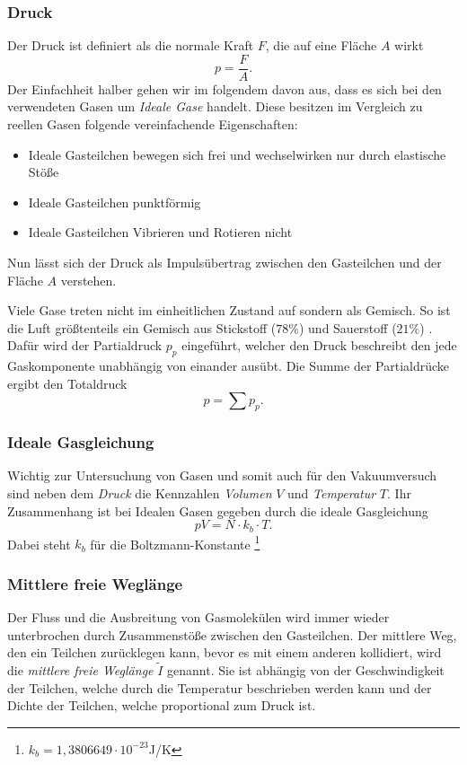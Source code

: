 \subsubsection{Druck}
Der Druck ist definiert als die normale Kraft $F$, die auf eine Fläche $A$ wirkt
\begin{equation}
    p = \frac{F}{A}. \label{eq:Druck}
\end{equation}
Der Einfachheit halber gehen wir im folgendem davon aus, 
dass es sich bei den verwendeten Gasen um \textit{Ideale Gase} handelt.
Diese besitzen im Vergleich zu reellen Gasen folgende vereinfachende Eigenschaften:
\begin{itemize}
    \item Ideale Gasteilchen bewegen sich frei und wechselwirken nur durch elastische Stöße
    \item Ideale Gasteilchen punktförmig
    \item Ideale Gasteilchen Vibrieren und Rotieren nicht 
\end{itemize}
Nun lässt sich der Druck als Impulsübertrag zwischen den Gasteilchen und der Fläche $A$ verstehen.  

Viele Gase treten nicht im einheitlichen Zustand auf sondern als Gemisch.
So ist die Luft größtenteils ein Gemisch aus Stickstoff ($78\%$) und Sauerstoff ($21\%$) \cite{luft}. 
Dafür wird der Partialdruck $p_p$ eingeführt, 
welcher den Druck beschreibt den jede Gaskomponente unabhängig von einander ausübt.
Die Summe der Partialdrücke ergibt den Totaldruck
\begin{equation}
    p = \sum p_p.
\end{equation}

\subsubsection{Ideale Gasgleichung}
Wichtig zur Untersuchung von Gasen 
und somit auch für den Vakuumversuch sind neben dem \textit{Druck} die Kennzahlen \textit{Volumen} $V$
und \textit{Temperatur} $T$.
Ihr Zusammenhang ist bei Idealen Gasen gegeben durch die ideale Gasgleichung
\begin{equation}
    pV=N\cdot k_b\cdot T. \label{eq:idealgaß}
\end{equation}
Dabei steht $k_b$ für die Boltzmann-Konstante \footnote{$k_b = 1,3806649\cdot10^{-23}$J/K}

\subsubsection{Mittlere freie Weglänge}
Der Fluss und die Ausbreitung von Gasmolekülen wird immer wieder unterbrochen durch Zusammenstöße zwischen den Gasteilchen.
Der mittlere Weg, 
den ein Teilchen zurücklegen kann, bevor es mit einem anderen kollidiert, wird die \textit{mittlere freie Weglänge} $\tilde{I}$ genannt.
Sie ist abhängig von der Geschwindigkeit der Teilchen, welche durch die Temperatur beschrieben werden kann 
und der Dichte der Teilchen, welche proportional zum Druck ist.  

